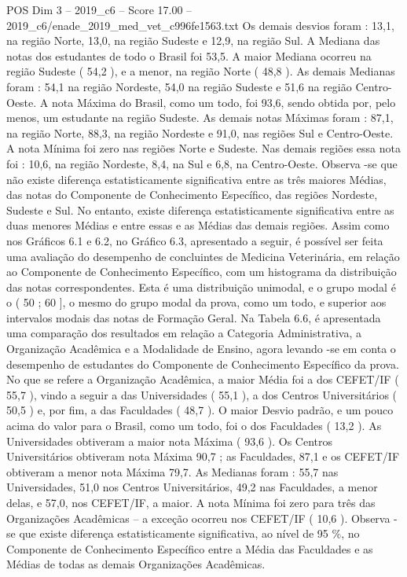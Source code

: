 \begin{textsample}{POS Dim 3 – 2019\_c6 – Score 17.00 – 2019\_c6/enade\_2019\_med\_vet\_c996fe1563.txt}
Os demais desvios foram : 13,1, na região Norte, 13,0, na região Sudeste e 12,9, na região Sul.
A Mediana das notas dos estudantes de todo o Brasil foi 53,5.
A maior Mediana ocorreu na região Sudeste ( 54,2 ), e a menor, na região Norte ( 48,8 ).
As demais Medianas foram : 54,1 na região Nordeste, 54,0 na região Sudeste e 51,6 na região Centro-Oeste.
A nota Máxima do Brasil, como um todo, foi 93,6, sendo obtida por, pelo menos, um estudante na região Sudeste.
As demais notas Máximas foram : 87,1, na região Norte, 88,3, na região Nordeste e 91,0, nas regiões Sul e Centro-Oeste.
A nota Mínima foi zero nas regiões Norte e Sudeste.
Nas demais regiões essa nota foi : 10,6, na região Nordeste, 8,4, na Sul e 6,8, na Centro-Oeste.
Observa -se que não existe diferença estatisticamente significativa entre as três maiores Médias, das notas do Componente de Conhecimento Específico, das regiões Nordeste, Sudeste e Sul.
No entanto, existe diferença estatisticamente significativa entre as duas menores Médias e entre essas e as Médias das demais regiões.
Assim como nos Gráficos 6.1 e 6.2, no Gráfico 6.3, apresentado a seguir, é possível ser feita uma avaliação do desempenho de concluintes de Medicina Veterinária, em relação ao Componente de Conhecimento Específico, com um histograma da distribuição das notas correspondentes.
Esta é uma distribuição unimodal, e o grupo modal é o ( 50 ; 60 ], o mesmo do grupo modal da prova, como um todo, e superior aos intervalos modais das notas de Formação Geral.
Na Tabela 6.6, é apresentada uma comparação dos resultados em relação a Categoria Administrativa, a Organização Acadêmica e a Modalidade de Ensino, agora levando -se em conta o desempenho de estudantes do Componente de Conhecimento Específico da prova.
No que se refere a Organização Acadêmica, a maior Média foi a dos CEFET/IF ( 55,7 ), vindo a seguir a das Universidades ( 55,1 ), a dos Centros Universitários ( 50,5 ) e, por fim, a das Faculdades ( 48,7 ).
O maior Desvio padrão, e um pouco acima do valor para o Brasil, como um todo, foi o dos Faculdades ( 13,2 ).
As Universidades obtiveram a maior nota Máxima ( 93,6 ).
Os Centros Universitários obtiveram nota Máxima 90,7 ; as Faculdades, 87,1 e os CEFET/IF obtiveram a menor nota Máxima 79,7.
As Medianas foram : 55,7 nas Universidades, 51,0 nos Centros Universitários, 49,2 nas Faculdades, a menor delas, e 57,0, nos CEFET/IF, a maior.
A nota Mínima foi zero para três das Organizações Acadêmicas – a exceção ocorreu nos CEFET/IF ( 10,6 ).
Observa -se que existe diferença estatisticamente significativa, ao nível de 95 \%, no Componente de Conhecimento Específico entre a Média das Faculdades e as Médias de todas as demais Organizações Acadêmicas.

\end{textsample}
